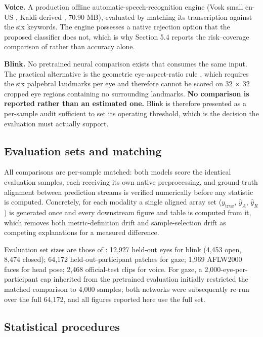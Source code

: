 \textbf{Voice.} A production offline automatic-speech-recognition engine (Vosk small en-US , Kaldi-derived , 70.90 MB), evaluated by matching its transcription against the six keywords. The engine possesses a native rejection option that the proposed classifier does not, which is why Section 5.4 reports the risk--coverage comparison of  rather than accuracy alone.

\textbf{Blink.} No pretrained neural comparison exists that consumes the same input. The practical alternative is the geometric eye-aspect-ratio rule , which requires the six palpebral landmarks per eye and therefore cannot be scored on 32 $\times$ 32 cropped eye regions containing no surrounding landmarks. \textbf{No comparison is reported rather than an estimated one.} Blink is therefore presented as a per-sample audit sufficient to set its operating threshold, which is the decision the evaluation must actually support.

\FloatBarrier

\subsection{Evaluation sets and matching}

All comparisons are per-sample matched: both models score the identical evaluation samples, each receiving its own native preprocessing, and ground-truth alignment between prediction streams is verified numerically before any statistic is computed. Concretely, for each modality a single aligned array set ($y_{\mathrm{true}}$, $\hat{y}_{A}$, $\hat{y}_{R}$) is generated once and every downstream figure and table is computed from it, which removes both metric-definition drift and sample-selection drift as competing explanations for a measured difference.

Evaluation set sizes are those of : 12,927 held-out eyes for blink (4,453 open, 8,474 closed); 64,172 held-out-participant patches for gaze; 1,969 AFLW2000 faces for head pose; 2,468 official-test clips for voice. For gaze, a 2,000-eye-per-participant cap inherited from the pretrained evaluation initially restricted the matched comparison to 4,000 samples; both networks were subsequently re-run over the full 64,172, and all figures reported here use the full set.

\FloatBarrier

\subsection{Statistical procedures}

